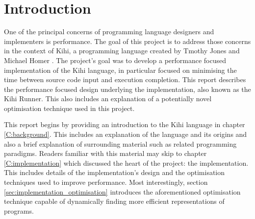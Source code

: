 \chapter{Introduction} \label{C:intro}
One of the principal concerns of programming language designers
and implementers is performance. The goal of this project is to address those concerns in the context of Kihi, a programming language created by Tmothy Jones and Michael Homer . The project's goal was to develop a performance focused implementation of the Kihi language, in particular focused on minimising the time between source code input and execution completion. This report describes the performance focused design underlying the implementation, also known as the Kihi Runner. This also includes an explanation of a potentially novel optimisation technique used in this project.

This report begins by providing an introduction to the Kihi language in chapter \ref{C:background}. This includes an explanation of the language and its origins and also a brief explanation of surrounding material such as related programming paradigms. Readers familiar with this material may skip to chapter \ref{C:implementation} which discussed the heart of the project: the implementation. This includes details of the implementation's design and the optimisation techniques used to improve performance. Most interestingly, section \ref{sec:implementation_optimisation} introduces the aforementioned optimisation technique capable of dynamically finding more efficient representations of programs.


